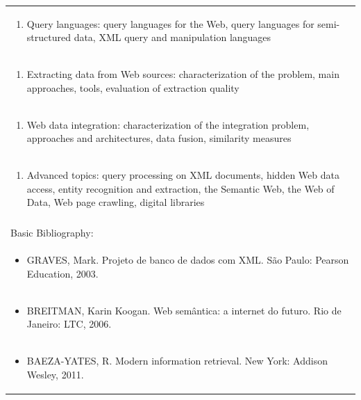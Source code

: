 \documentclass[11pt]{article}
\begin{document}
\begin{center}
\begin{longtable}{|p{4cm}|p{4cm}|p{4cm}|p{4cm}|}
\multicolumn{4}{|p{\dimexpr 16cm + 6\tabcolsep\relax}|}{\begin{enumerate}[start=3]\item Query languages: query languages for the Web, query languages for semi-structured data, XML query and manipulation languages\end{enumerate}}\\
\multicolumn{4}{|p{\dimexpr 16cm + 6\tabcolsep\relax}|}{\begin{enumerate}[start=4]\item Extracting data from Web sources: characterization of the problem, main approaches, tools, evaluation of extraction quality\end{enumerate}}\\
\multicolumn{4}{|p{\dimexpr 16cm + 6\tabcolsep\relax}|}{\begin{enumerate}[start=5]\item Web data integration: characterization of the integration problem, approaches and architectures, data fusion, similarity measures\end{enumerate}}\\
\multicolumn{4}{|p{\dimexpr 16cm + 6\tabcolsep\relax}|}{\begin{enumerate}[start=6]\item Advanced topics: query processing on XML documents, hidden Web data access, entity recognition and extraction, the Semantic Web, the Web of Data, Web page crawling, digital libraries\end{enumerate}}\\
\multicolumn{4}{|p{\dimexpr 16cm + 6\tabcolsep\relax}|}{}\\
\hline
\multicolumn{4}{|p{16cm}|}{Basic Bibliography:}\\*
\multicolumn{4}{|p{\dimexpr 16cm + 6\tabcolsep\relax}|}{\begin{itemize}\item GRAVES, Mark. Projeto de banco de dados com XML. São Paulo: Pearson Education, 2003.\end{itemize}}\\
\multicolumn{4}{|p{\dimexpr 16cm + 6\tabcolsep\relax}|}{\begin{itemize}\item BREITMAN, Karin Koogan. Web semântica: a internet do futuro. Rio de Janeiro: LTC, 2006.\end{itemize}}\\
\multicolumn{4}{|p{\dimexpr 16cm + 6\tabcolsep\relax}|}{\begin{itemize}\item BAEZA-YATES, R. Modern information retrieval. New York: Addison Wesley, 2011.\end{itemize}}\\

\end{longtable}
\end{center}
\end{document}
